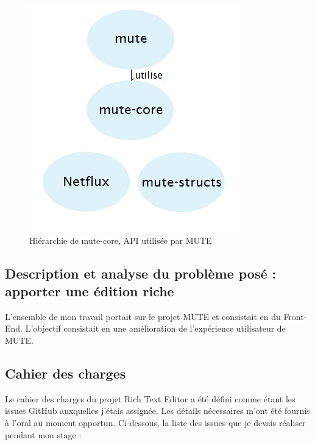 \documentclass[12pt]{article}
\begin{document}
\begin{figure}[H]
\centering
\includegraphics[scale=0.52]{gallery/hierarchy.jpg}
\caption[nom dans le sommaire]{Hiérarchie de mute-core, API utilisée par MUTE}
\label{fig:gallery0}
\end{figure}

\subsection{Description et analyse du problème posé : apporter une édition riche}
L'ensemble de mon travail portait sur le projet MUTE et consistait en du Front-End. L'objectif consistait en une amélioration de l'expérience utilisateur de MUTE.


\subsection{Cahier des charges}
Le cahier des charges du projet Rich Text Editor a été défini comme étant les issues GitHub auxquelles j'étais assignée. Les détails nécessaires m'ont été fournis à l'oral au moment opportun. Ci-dessous, la liste des issues que je devais réaliser pendant mon stage :\\
\end{document}
